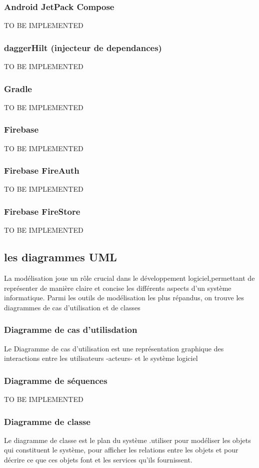 \subsubsection{Android JetPack Compose}
TO BE IMPLEMENTED
\subsubsection{daggerHilt (injecteur de dependances)}
TO BE IMPLEMENTED
\subsubsection{Gradle}
TO BE IMPLEMENTED
\subsubsection{Firebase}
TO BE IMPLEMENTED
\subsubsection{Firebase FireAuth}
TO BE IMPLEMENTED
\subsubsection{Firebase FireStore}
TO BE IMPLEMENTED


\subsection{les diagrammes UML}
La modélisation  joue un rôle crucial  dans le développement logiciel,permettant de représenter de manière claire et concise les différents aspects d'un système informatique. 
Parmi les outils de modélisation les plus répandus, on trouve les diagrammes de cas d'utilisation et de classes

\subsubsection{Diagramme de cas d'utilisdation}
Le  Diagramme de cas d'utilisation est une représentation graphique des interactions entre les utilisateurs -acteurs- et le système logiciel



\subsubsection{Diagramme de séquences}
TO BE IMPLEMENTED
\subsubsection{Diagramme de classe}
Le diagramme de classe est le plan du système .utiliser pour modéliser les objets qui constituent le système, pour afficher les relations entre les objets et pour décrire ce que ces objets font et les services qu'ils fournissent.
\cite{IBM:class}